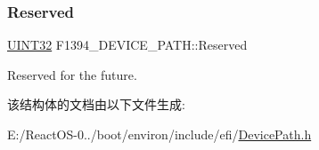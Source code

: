 \subsubsection{\texorpdfstring{Reserved}{Reserved}}
{\footnotesize\ttfamily \hyperlink{_processor_bind_8h_ae1e6edbbc26d6fbc71a90190d0266018}{U\+I\+N\+T32} F1394\+\_\+\+D\+E\+V\+I\+C\+E\+\_\+\+P\+A\+T\+H\+::\+Reserved}

Reserved for the future. 

该结构体的文档由以下文件生成\+:\begin{DoxyCompactItemize}
\item 
E\+:/\+React\+O\+S-\/0../boot/environ/include/efi/\hyperlink{_device_path_8h}{Device\+Path.\+h}\end{DoxyCompactItemize}
